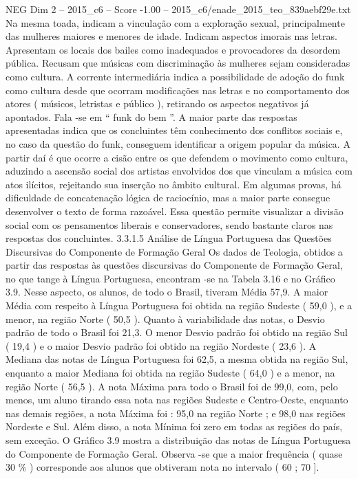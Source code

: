 \begin{textsample}{NEG Dim 2 – 2015\_c6 – Score -1.00 – 2015\_c6/enade\_2015\_teo\_839aebf29e.txt}
Na mesma toada, indicam a vinculação com a exploração sexual, principalmente das mulheres maiores e menores de idade.
Indicam aspectos imorais nas letras.
Apresentam os locais dos bailes como inadequados e provocadores da desordem pública.
Recusam que músicas com discriminação às mulheres sejam consideradas como cultura.
A corrente intermediária indica a possibilidade de adoção do funk como cultura desde que ocorram modificações nas letras e no comportamento dos atores ( músicos, letristas e público ), retirando os aspectos negativos já apontados.
Fala -se em “ funk do bem ”.
A maior parte das respostas apresentadas indica que os concluintes têm conhecimento dos conflitos sociais e, no caso da questão do funk, conseguem identificar a origem popular da música.
A partir daí é que ocorre a cisão entre os que defendem o movimento como cultura, aduzindo a ascensão social dos artistas envolvidos dos que vinculam a música com atos ilícitos, rejeitando sua inserção no âmbito cultural.
Em algumas provas, há dificuldade de concatenação lógica de raciocínio, mas a maior parte consegue desenvolver o texto de forma razoável.
Essa questão permite visualizar a divisão social com os pensamentos liberais e conservadores, sendo bastante claros nas respostas dos concluintes. 3.3.1.5 Análise de Língua Portuguesa das Questões Discursivas do Componente de Formação Geral Os dados de Teologia, obtidos a partir das respostas às questões discursivas do Componente de Formação Geral, no que tange à Língua Portuguesa, encontram -se na Tabela 3.16 e no Gráfico 3.9.
Nesse aspecto, os alunos, de todo o Brasil, tiveram Média 57,9.
A maior Média com respeito à Língua Portuguesa foi obtida na região Sudeste ( 59,0 ), e a menor, na região Norte ( 50,5 ).
Quanto à variabilidade das notas, o Desvio padrão de todo o Brasil foi 21,3.
O menor Desvio padrão foi obtido na região Sul ( 19,4 ) e o maior Desvio padrão foi obtido na região Nordeste ( 23,6 ).
A Mediana das notas de Língua Portuguesa foi 62,5, a mesma obtida na região Sul, enquanto a maior Mediana foi obtida na região Sudeste ( 64,0 ) e a menor, na região Norte ( 56,5 ).
A nota Máxima para todo o Brasil foi de 99,0, com, pelo menos, um aluno tirando essa nota nas regiões Sudeste e Centro-Oeste, enquanto nas demais regiões, a nota Máxima foi : 95,0 na região Norte ; e 98,0 nas regiões Nordeste e Sul.
Além disso, a nota Mínima foi zero em todas as regiões do país, sem exceção.
O Gráfico 3.9 mostra a distribuição das notas de Língua Portuguesa do Componente de Formação Geral.
Observa -se que a maior frequência ( quase 30 \% ) corresponde aos alunos que obtiveram nota no intervalo ( 60 ; 70 ].

\end{textsample}

